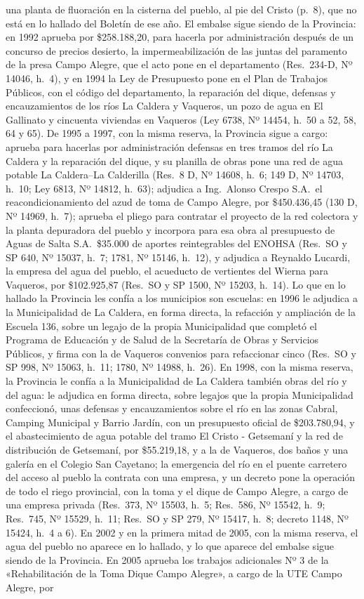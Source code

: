 una planta de fluoración en la cisterna del pueblo, al pie del Cristo (p.~8), que no está en lo hallado del Boletín de ese año. El embalse sigue siendo de la Provincia: en 1992 aprueba por \$258.188,20, para hacerla por administración después de un concurso de precios desierto, la impermeabilización de las juntas del paramento de la presa Campo Alegre, que el acto pone en el departamento (Res.\ 234-D, Nº 14046, h.\ 4), y en 1994 la Ley de Presupuesto pone en el Plan de Trabajos Públicos, con el código del departamento, la reparación del dique, defensas y encauzamientos de los ríos La Caldera y Vaqueros, un pozo de agua en El Gallinato y cincuenta viviendas en Vaqueros (Ley 6738, Nº 14454, h.\ 50 a 52, 58, 64 y 65). De 1995 a 1997, con la misma reserva, la Provincia sigue a cargo: aprueba para hacerlas por administración defensas en tres tramos del río La Caldera y la reparación del dique, y su planilla de obras pone una red de agua potable La Caldera--La Calderilla (Res.\ 8 D, Nº 14608, h.\ 6; 149 D, Nº 14703, h.\ 10; Ley 6813, Nº 14812, h.\ 63); adjudica a Ing.\ Alonso Crespo S.A.\ el reacondicionamiento del azud de toma de Campo Alegre, por \$450.436,45 (130 D, Nº 14969, h.\ 7); aprueba el pliego para contratar el proyecto de la red colectora y la planta depuradora del pueblo y incorpora para esa obra al presupuesto de Aguas de Salta S.A.\ \$35.000 de aportes reintegrables del ENOHSA (Res.\ SO y SP 640, Nº 15037, h.\ 7; 1781, Nº 15146, h.\ 12), y adjudica a Reynaldo Lucardi, la empresa del agua del pueblo, el acueducto de vertientes del Wierna para Vaqueros, por \$102.925,87 (Res.\ SO y SP 1500, Nº 15203, h.\ 14). Lo que en lo hallado la Provincia les confía a los municipios son escuelas: en 1996 le adjudica a la Municipalidad de La Caldera, en forma directa, la refacción y ampliación de la Escuela 136, sobre un legajo de la propia Municipalidad que completó el Programa de Educación y de Salud de la Secretaría de Obras y Servicios Públicos, y firma con la de Vaqueros convenios para refaccionar cinco (Res.\ SO y SP 998, Nº 15063, h.\ 11; 1780, Nº 14988, h.\ 26). En 1998, con la misma reserva, la Provincia le confía a la Municipalidad de La Caldera también obras del río y del agua: le adjudica en forma directa, sobre legajos que la propia Municipalidad confeccionó, unas defensas y encauzamientos sobre el río en las zonas Cabral, Camping Municipal y Barrio Jardín, con un presupuesto oficial de \$203.780,94, y el abastecimiento de agua potable del tramo El Cristo - Getsemaní y la red de distribución de Getsemaní, por \$55.219,18, y a la de Vaqueros, dos baños y una galería en el Colegio San Cayetano; la emergencia del río en el puente carretero del acceso al pueblo la contrata con una empresa, y un decreto pone la operación de todo el riego provincial, con la toma y el dique de Campo Alegre, a cargo de una empresa privada (Res.\ 373, Nº 15503, h.\ 5; Res.\ 586, Nº 15542, h.\ 9; Res.\ 745, Nº 15529, h.\ 11; Res.\ SO y SP 279, Nº 15417, h.\ 8; decreto 1148, Nº 15424, h.\ 4 a 6). En 2002 y en la primera mitad de 2005, con la misma reserva, el agua del pueblo no aparece en lo hallado, y lo que aparece del embalse sigue siendo de la Provincia. En 2005 aprueba los trabajos adicionales Nº 3 de la «Rehabilitación de la Toma Dique Campo Alegre», a cargo de la UTE Campo Alegre, por 
